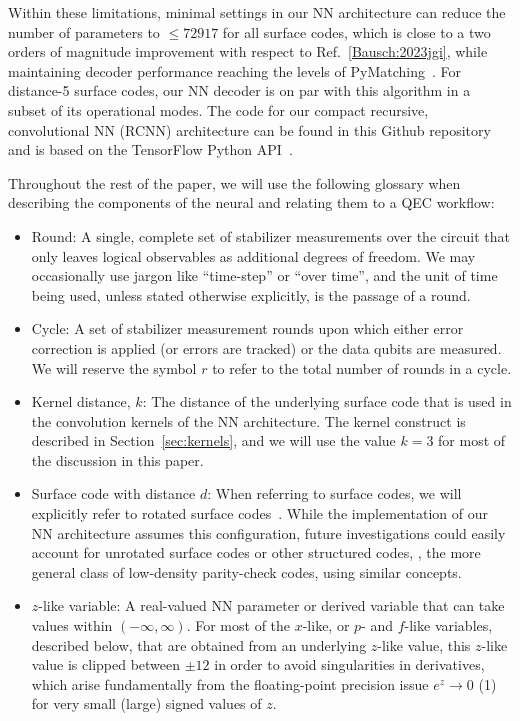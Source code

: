 Within these limitations, minimal settings in our NN architecture can reduce the number of parameters to $\leq 72917$ for all surface codes, which is close to a two orders of magnitude improvement with respect to Ref.~\ref{Bausch:2023jgi}, while maintaining decoder performance reaching the levels of PyMatching~\cite{Higgott:2023}. For distance-5 surface codes, our NN decoder is on par with this algorithm in a subset of its operational modes. The code for our compact recursive, convolutional NN (RCNN) architecture can be found in this Github repository~\cite{ourcode} and is based on the TensorFlow Python API~\cite{tensorflow,tensorflow2}.

Throughout the rest of the paper, we will use the following glossary when describing the components of the neural and relating them to a QEC workflow:
\begin{itemize}
\item Round: A single, complete set of stabilizer measurements over the circuit that only leaves logical observables as additional degrees of freedom.
We may occasionally use jargon like ``time-step'' or ``over time'', and the unit of time being used, unless stated otherwise explicitly, is the passage of a round.
\item Cycle: A set of stabilizer measurement rounds upon which either error correction is applied (or errors are tracked) or the data qubits are measured. We will reserve the symbol $r$ to refer to the total number of rounds in a cycle.
\item Kernel distance, $k$: The distance of the underlying surface code that is used in the convolution kernels of the NN architecture. The kernel construct is described in Section~\ref{sec:kernels}, and we will use the value $k=3$ for most of the discussion in this paper.
\item Surface code with distance $d$: When referring to surface codes, we will explicitly refer to rotated surface codes~\cite{Bombin:2007}. While the implementation of our NN architecture assumes this configuration, future investigations could easily account for unrotated surface codes or other structured codes, \eg, the more general class of low-density parity-check codes, using similar concepts.
\item $z$-like variable: A real-valued NN parameter or derived variable that can take values within $(-\infty, \infty)$. For most of the $x$-like, or $p$- and $f$-like variables, described below, that are obtained from an underlying $z$-like value, this $z$-like value is clipped between $\pm12$ in order to avoid singularities in derivatives, which arise fundamentally from the floating-point precision issue $e^z \to 0$ (1) for very small (large) signed values of $z$.

\end{itemize}
